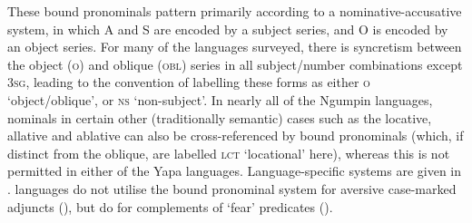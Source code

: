 \documentclass[output=paper,colorlinks,citecolor=brown]{langscibook}
\begin{document}
These bound pronominals pattern primarily according to a nominative-accusative system, in which A and S are encoded by a subject series, and O is encoded by an object series. For many of the languages surveyed, there is syncretism between the object (\textsc{o})  and oblique (\textsc{obl}) series in all subject/number combinations except \textsc{3sg}, leading to the convention of labelling these forms as either \textsc{o} `object/oblique', or \textsc{ns} `non-subject'. In nearly all of the Ngumpin languages, nominals in certain other (traditionally semantic) cases such as the locative, allative and ablative can also be cross-referenced by bound pronominals (which, if distinct from the oblique, are labelled \textsc{lct} `locational' here), whereas this is not permitted in either of the Yapa languages. Language-specific systems are given in .  languages do not utilise the bound pronominal system for aversive case-marked adjuncts (), but do for complements of `fear' predicates ().
\end{document}
